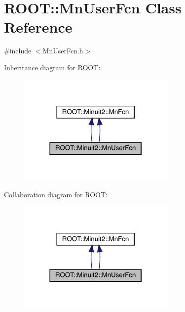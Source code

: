 \hypertarget{classROOT_1_1Minuit2_1_1MnUserFcn}{}\section{R\+O\+OT\+:\+:Mn\+User\+Fcn Class Reference}
\label{classROOT_1_1Minuit2_1_1MnUserFcn}


{\ttfamily \#include $<$Mn\+User\+Fcn.\+h$>$}



Inheritance diagram for R\+O\+OT\+:\nopagebreak
\begin{figure}[H]
\begin{center}
\leavevmode
\includegraphics[width=219pt]{df/d87/classROOT_1_1Minuit2_1_1MnUserFcn__inherit__graph}
\end{center}
\end{figure}


Collaboration diagram for R\+O\+OT\+:\nopagebreak
\begin{figure}[H]
\begin{center}
\leavevmode
\includegraphics[width=219pt]{da/dda/classROOT_1_1Minuit2_1_1MnUserFcn__coll__graph}
\end{center}
\end{figure}
